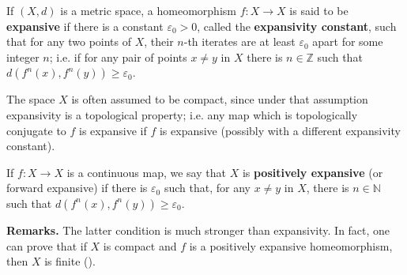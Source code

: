 \documentclass[12pt]{article}
\newcommand{\N}{\mathbb{N}}
\newcommand{\Z}{\mathbb{Z}}
\begin{document}
If $(X,d)$ is a metric space, a homeomorphism $f\colon X\to X$ is said to be \textbf{expansive} if there is a constant $\varepsilon_0>0$, called the \textbf{expansivity constant}, such that for any two points of $X$, their $n$-th iterates are at least $\varepsilon_0$ apart for some integer $n$; i.e. if for any pair of points $x\neq y$ in $X$ there is $n\in \Z$ such that $d(f^n(x),f^n(y))\geq \varepsilon_0$.  

The space $X$ is often assumed to be compact, since under that assumption expansivity is a topological property; i.e. any map which is topologically conjugate to $f$ is expansive if $f$ is expansive (possibly with a different expansivity constant).

If $f\colon X\to X$ is a continuous map, we say that $X$ is \textbf{positively expansive} (or forward expansive) if there is $\varepsilon_0$ such that, for any $x\neq y$ in $X$, there is $n\in \N$ such that $d(f^n(x),f^n(y))\geq \varepsilon_0$. 

\textbf{Remarks.} The latter condition is much stronger than expansivity. In fact, one can prove that if $X$ is compact and $f$ is a positively expansive homeomorphism, then $X$ is finite ().
\end{document}
